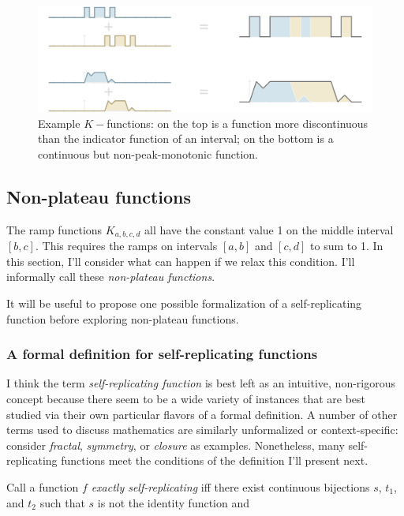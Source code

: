 \documentclass[20pt,]{extarticle}
\begin{document}
\begin{figure}[htbp]
\centering
\includegraphics{images/other_ramps2.png}
\caption{\label{fig:other_ramps}Example \(K-\)functions: on the top is a
function more discontinuous than the indicator function of an interval;
on the bottom is a continuous but non-peak-monotonic
function.}\label{fig:otherux5framps}
\end{figure}

\subsection{Non-plateau functions}\label{non-plateau-functions}

The ramp functions \(K_{a,b,c,d}\) all have the constant value 1 on the
middle interval \([b, c]\). This requires the ramps on intervals
\([a, b]\) and \([c, d]\) to sum to 1. In this section, I'll consider
what can happen if we relax this condition. I'll informally call these
\emph{non-plateau functions}.

It will be useful to propose one possible formalization of a
self-replicating function before exploring non-plateau functions.

\subsubsection{A formal definition for self-replicating
functions}\label{a-formal-definition-for-self-replicating-functions}

I think the term \emph{self-replicating function} is best left as an
intuitive, non-rigorous concept because there seem to be a wide variety
of instances that are best studied via their own particular flavors of a
formal definition. A number of other terms used to discuss mathematics
are similarly unformalized or context-specific: consider \emph{fractal},
\emph{symmetry}, or \emph{closure} as examples. Nonetheless, many
self-replicating functions meet the conditions of the definition I'll
present next.

Call a function \(f\) \emph{exactly self-replicating} iff there exist
continuous bijections \(s\), \(t_1\), and \(t_2\) such that \(s\) is not
the identity function and
\end{document}
